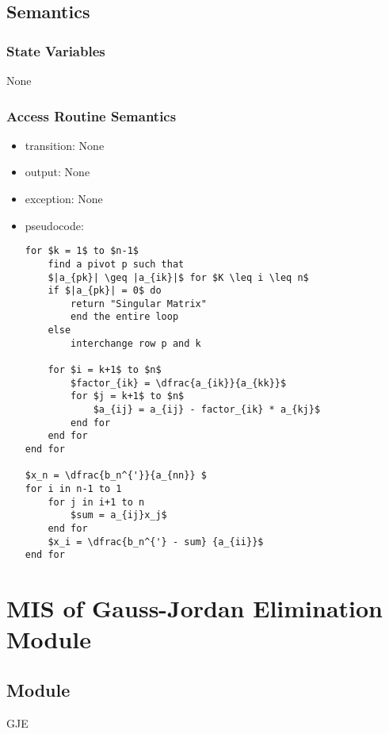 \documentclass[12pt, titlepage]{article}
\begin{document}
\subsection{Semantics}

\subsubsection{State Variables}

None

\subsubsection{Access Routine Semantics}

\noindent %
\begin{itemize}
\item transition: None%
\item output: None%
\item exception: None%
\item pseudocode:
\begin{lstlisting}[mathescape=true]
for $k = 1$ to $n-1$
    find a pivot p such that
    $|a_{pk}| \geq |a_{ik}|$ for $K \leq i \leq n$
    if $|a_{pk}| = 0$ do
        return "Singular Matrix"
        end the entire loop
    else 
        interchange row p and k
        
    for $i = k+1$ to $n$
        $factor_{ik} = \dfrac{a_{ik}}{a_{kk}}$
        for $j = k+1$ to $n$
            $a_{ij} = a_{ij} - factor_{ik} * a_{kj}$
        end for
    end for
end for

$x_n = \dfrac{b_n^{'}}{a_{nn}} $
for i in n-1 to 1
    for j in i+1 to n
        $sum = a_{ij}x_j$
    end for
    $x_i = \dfrac{b_n^{'} - sum} {a_{ii}}$
end for
\end{lstlisting}
\end{itemize}

\section{MIS of {Gauss-Jordan Elimination  Module}} \label{modgje}

\subsection{Module}

GJE

\end{document}

